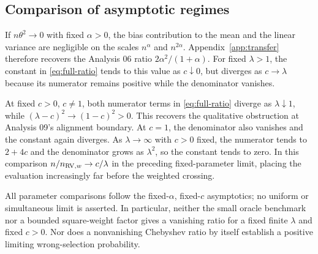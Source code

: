 \documentclass[11pt]{article}
\theoremstyle{definition}
\begin{document}
\subsection{Comparison of asymptotic regimes}\label{app:regimes}
If $n\theta^2\to0$ with fixed $\alpha>0$, the bias contribution to
the mean and the linear variance are negligible on the scales
$n^\alpha$ and $n^{2\alpha}$. Appendix~\ref{app:transfer} therefore
recovers the Analysis 06 ratio $2\alpha^2/(1+\alpha)$.
For fixed $\lambda>1$, the constant in \eqref{eq:full-ratio} tends
to this value as $c\downarrow0$, but diverges as $c\to\lambda$
because its numerator remains positive while the denominator vanishes.

At fixed $c>0$, $c\ne1$, both numerator terms in
\eqref{eq:full-ratio} diverge as $\lambda\downarrow1$, while
$(\lambda-c)^2\to(1-c)^2>0$. This recovers the qualitative
obstruction at Analysis 09's alignment boundary. At $c=1$, the
denominator also vanishes and the constant again diverges.
As $\lambda\to\infty$ with $c>0$ fixed, the numerator tends to
$2+4c$ and the denominator grows as $\lambda^2$, so the constant
tends to zero. In this comparison $n/n_{{\rm RV},w}\to c/\lambda$
in the preceding fixed-parameter limit, placing the evaluation
increasingly far before the weighted crossing.

All parameter comparisons follow the fixed-$\alpha$, fixed-$c$
asymptotics; no uniform or simultaneous limit is asserted. In
particular, neither the small oracle benchmark nor a bounded
square-weight factor gives a vanishing ratio for a fixed finite
$\lambda$ and fixed $c>0$. Nor does a nonvanishing Chebyshev ratio
by itself establish a positive limiting wrong-selection probability.
\end{document}
